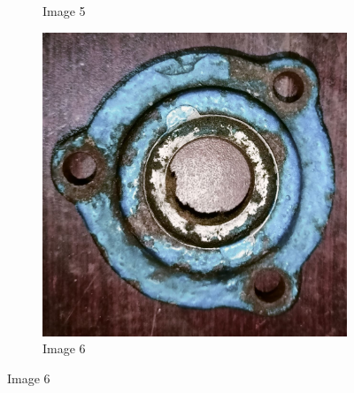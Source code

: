 \documentclass[12pt]{article}
\begin{document}
\begin{figure}
\begin{subfigure}{0.3\textwidth}
      \caption{Image 5}
  \end{subfigure}
  \hfill
  \begin{subfigure}{0.3\textwidth}
      \includegraphics[width=\linewidth]{img/06.jpg}
      \caption{Image 6}
  \end{subfigure}

  \vspace{0.5cm}


\end{figure}
\end{document}
